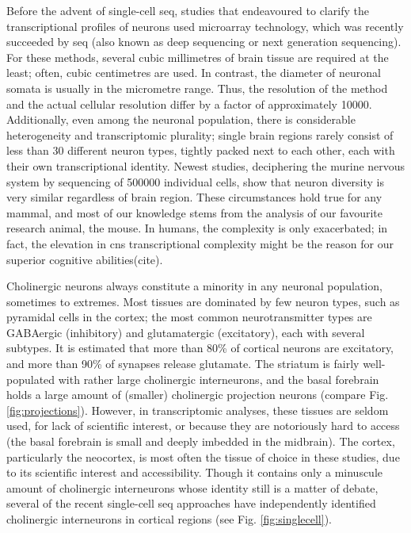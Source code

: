 Before the advent of single-cell \ac{seq}, studies that endeavoured to clarify the transcriptional profiles of neurons used microarray technology, which was recently succeeded by \ac{seq} (also known as deep sequencing or next generation sequencing). For these methods, several cubic millimetres of brain tissue are required at the least; often, cubic centimetres are used. In contrast, the diameter of neuronal somata is usually in the micrometre range. Thus, the resolution of the method and the actual cellular resolution differ by a factor of approximately \num{10000}. Additionally, even among the neuronal population, there is considerable heterogeneity and transcriptomic plurality; single brain regions rarely consist of less than 30 different neuron types, tightly packed next to each other, each with their own transcriptional identity\cite{Darmanis2015, Zeisel2015, Tasic2016, Habib2016}. Newest studies, deciphering the murine nervous system by sequencing of \num{500000} individual cells, show that neuron diversity is very similar regardless of brain region\cite{Zeisel2018}. These circumstances hold true for any mammal, and most of our knowledge stems from the analysis of our favourite research animal, the mouse. In humans, the complexity is only exacerbated; in fact, the elevation in \ac{cns} transcriptional complexity might be the reason for our superior cognitive abilities(cite).

Cholinergic neurons always constitute a minority in any neuronal population, sometimes to extremes. Most tissues are dominated by few neuron types, such as pyramidal cells in the cortex; the most common neurotransmitter types are GABAergic (inhibitory) and glutamatergic (excitatory), each with several subtypes. It is estimated that more than 80\% of cortical neurons are excitatory, and more than 90\% of synapses release glutamate\cite{Raichle2002}. The striatum is fairly well-populated with rather large cholinergic interneurons, and the basal forebrain holds a large amount of (smaller) cholinergic projection neurons (compare Fig. \ref{fig:projections}). However, in transcriptomic analyses, these tissues are seldom used, for lack of scientific interest, or because they are notoriously hard to access (the basal forebrain is small and deeply imbedded in the midbrain). The cortex, particularly the neocortex, is most often the tissue of choice in these studies, due to its scientific interest and accessibility. Though it contains only a minuscule amount of cholinergic interneurons whose identity still is a matter of debate, several of the recent single-cell \ac{seq} approaches have independently identified cholinergic interneurons in cortical regions (see Fig. \ref{fig:singlecell}). 

